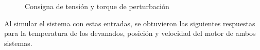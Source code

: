\documentclass[a4paper, 10pt, onecolumn,journal]{ieeeconf}
\begin{document}
\begin{figure}[H]
	\centering
	\begin{adjustbox}{max width=\columnwidth}
	\end{adjustbox}
	\caption{Consigna de tensión y torque de perturbación}
	\label{Consigna de tensión y torque de perturbación.}
\end{figure}
Al simular el sistema con estas entradas, se obtuvieron las siguientes respuestas para la temperatura de los devanados, posición y velocidad del motor de ambos sistemas.
\end{document}
